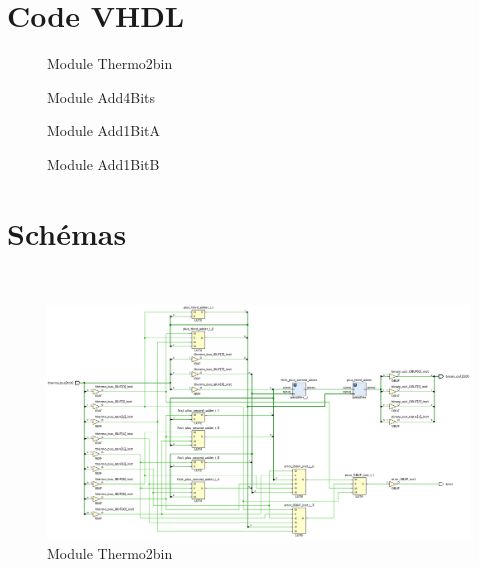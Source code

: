 \newpage
\appendix
\section{Code VHDL}

\begin{figure}[H]
	\tiny
	\centering
	\begin{varwidth}{\linewidth}
		
	\end{varwidth}
	\caption{Module Thermo2bin}
\end{figure}

\begin{figure}[H]
	\tiny
	\centering
	\begin{varwidth}{\linewidth}
		
	\end{varwidth}
	\caption{Module Add4Bits}
\end{figure}

\begin{figure}[H]
	\tiny
	\centering
	\begin{varwidth}{\linewidth}
		
	\end{varwidth}
	\caption{Module Add1BitA}
\end{figure}

\begin{figure}[H]
	\tiny
	\centering
	\begin{varwidth}{\linewidth}
		
	\end{varwidth}
	\caption{Module Add1BitB}
\end{figure}

\section{Schémas}

\\


\begin{figure}[H]
	\centering
	\includegraphics[width=.7\textwidth]{assets/img/schematic-thermo2bin.png}
	\caption{Module Thermo2bin}
\end{figure}

